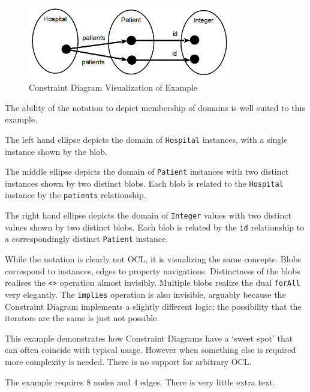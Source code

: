 \documentclass{llncs}
\begin{document}
\begin{figure}
	\vspace{-10pt}
	\begin{center}
		\includegraphics[width=3.5in]{ConstraintDiagram.png}
	\end{center}
	\vspace{-10pt}
	\caption{Constraint Diagram Visualization of Example}
	\label{fig:ConstraintDiagram}
	\vspace{-10pt}
\end{figure}

The ability of the notation to depict membership of domains is well suited to this example.

The left hand ellipse depicts the domain of \verb$Hospital$ instances, with a single instance shown by the blob.

The middle ellipse depicts the domain of \verb$Patient$ instances with two distinct instances shown by two distinct blobs. Each blob is related to the \verb$Hospital$ instance by the \verb$patients$ relationship.

The right hand ellipse depicts the domain of \verb$Integer$ values with two distinct values shown by two distinct blobs. Each blob is related by the \verb$id$ relationship to a correspondingly distinct \verb$Patient$ instance.

While the notation is clearly not OCL, it is visualizing the same concepts. Blobs correspond to instances, edges to property navigations. Distinctness of the blobs realises the \verb$<>$ operation almost invisibly. Multiple blobs realize the dual \verb$forAll$ very elegantly. The \verb$implies$ operation is also invisible, arguably because the Constraint Diagram implements a slightly different logic; the possibility that the iterators are the same is just not possible.

This example demonstrates how Constraint Diagrams have a `sweet spot' that can often coincide with typical usage. However when something else is required more complexity is needed. There is no support for arbitrary OCL.

The example requires 8 nodes and 4 edges. There is very little extra text.
\end{document}
